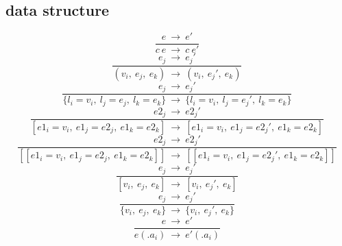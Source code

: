 \documentclass[10pt,a4paper]{article}
\begin{document}
\subsection*{ data structure }
\begin{equation}\frac{e\ \rightarrow \ e'}{c\ e\ \rightarrow \ c\ e'}\ \tag{\ E-CONST\ }\end{equation}
\begin{equation}\frac{e_j\ \rightarrow \ e_j'}{(v_i,\ e_j,\ e_k)\ \rightarrow \ (v_i,\ e_j',\ e_k)}\ \tag{\ E-TUPLES\ }\end{equation}
\begin{equation}\frac{e_j\ \rightarrow \ e_j'}{\{l_i=v_i,\ l_j=e_j,\ l_k=e_k\}\ \rightarrow \ \{l_i=v_i,\ l_j=e_j',\ l_k=e_k\}}\ \tag{\ E-RECORDS\ }\end{equation}
\begin{equation}\frac{e2_j\ \rightarrow \ e2_j'}{[e1_i=v_i,\ e1_j=e2_j,\ e1_k=e2_k]\ \rightarrow \ [e1_i=v_i,\ e1_j=e2_j',\ e1_k=e2_k]}\ \tag{\ E-MAP\ }\end{equation}
\begin{equation}\frac{e2_j\ \rightarrow \ e2_j'}{[[e1_i=v_i,\ e1_j=e2_j,\ e1_k=e2_k]]\ \rightarrow \ [[e1_i=v_i,\ e1_j=e2_j',\ e1_k=e2_k]]}\ \tag{\ E-BIGMAP\ }\end{equation}
\begin{equation}\frac{e_j\ \rightarrow \ e_j'}{[v_i,\ e_j,\ e_k]\ \rightarrow \ [v_i,\ e_j',\ e_k]}\ \tag{\ E-LIST\ }\end{equation}
\begin{equation}\frac{e_j\ \rightarrow \ e_j'}{\{v_i,\ e_j,\ e_k\}\ \rightarrow \ \{v_i,\ e_j',\ e_k\}}\ \tag{\ E-SET\ }\end{equation}
\begin{equation}\frac{e\ \rightarrow \ e'}{e(.a_i)\ \rightarrow \ e'(.a_i)}\ \tag{\ E-ACCESS\ }\end{equation}
\end{document}
